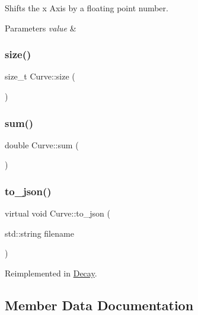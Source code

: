 Shifts the x Axis by a floating point number.


\begin{DoxyParams}{Parameters}
{\em value} & \\
\hline
\end{DoxyParams}
\mbox{\label{class_curve_add93ea6b8418185dcc647273fd85bcef}} 
\subsubsection{\texorpdfstring{size()}{size()}}
{\footnotesize\ttfamily size\+\_\+t Curve\+::size (\begin{DoxyParamCaption}{ }\end{DoxyParamCaption})}

\mbox{\label{class_curve_a6d554f1ab79e7b741eea5abded25874b}} 
\subsubsection{\texorpdfstring{sum()}{sum()}}
{\footnotesize\ttfamily double Curve\+::sum (\begin{DoxyParamCaption}{ }\end{DoxyParamCaption})}

\mbox{\label{class_curve_a6c16b3a6a4f4bd9540780d4e68d90545}} 
\subsubsection{\texorpdfstring{to\+\_\+json()}{to\_json()}}
{\footnotesize\ttfamily virtual void Curve\+::to\+\_\+json (\begin{DoxyParamCaption}\item[{std\+::string}]{filename }\end{DoxyParamCaption})\hspace{0.3cm}{\ttfamily [virtual]}}



Reimplemented in \hyperlink{class_decay_afb84196cbc6cc532bf0ce5db85f39616}{Decay}.



\subsection{Member Data Documentation}
\mbox{\label{class_curve_aaabf36e61b8b305b761587e4cc9737e3}} 

